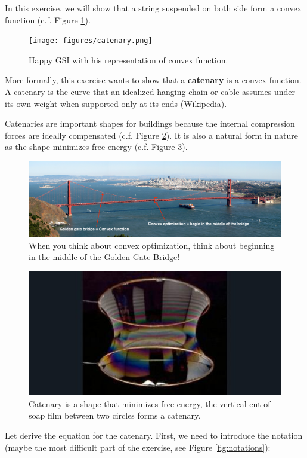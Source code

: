 
In this exercise, we will show that a string suspended on both side form a convex function (c.f. Figure \ref{fig:gsi}). 

\begin{figure}[h]
\centering
\texttt{[image: figures/catenary.png]}
\caption{Happy GSI with his representation of convex function.}
\label{fig:gsi}
\end{figure}

More formally, this exercise wants to show that a \textbf{catenary} is a convex function. 
A catenary is the curve that an idealized hanging chain or cable assumes under its own weight when supported only at its ends (Wikipedia).

Catenaries are important shapes for buildings because the internal compression forces are ideally compensated (c.f. Figure \ref{fig:bridge}).
It is also a natural form in nature as the shape minimizes free energy (c.f. Figure \ref{fig:soap}).

\begin{figure}[h]
\centering
\includegraphics[width=.95\textwidth]{figures/golden_gate.jpg}
\caption{When you think about convex optimization, think about beginning in the middle of the Golden Gate Bridge!}
\label{fig:bridge}
\end{figure}

\begin{figure}[h]
\centering
\includegraphics[width=.4\textwidth]{figures/soap.jpg}
\caption{Catenary is a shape that minimizes free energy, the vertical cut of soap film between two circles forms a catenary.}
\label{fig:soap}
\end{figure}

Let derive the equation for the catenary.
First, we need to introduce the notation (maybe the most difficult part of the exercise, see Figure \ref{fig:notations}):

